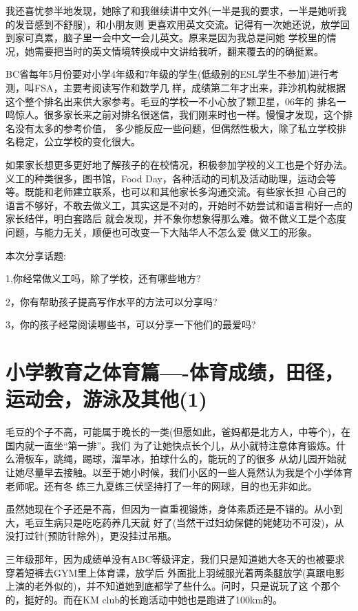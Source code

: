\documentclass[11pt,a4paper,onecolumn]{article}
\begin{document}
我还喜忧参半地发现，她除了和我继续讲中文外(一半是我的要求，一半是她听我的发音感到不舒服)，和小朋友则
更喜欢用英文交流。记得有一次她还说，放学回到家可真累，脑子里一会中文一会儿英文。原来是因为我总是问她
学校里的情况，她需要把当时的英文情境转换成中文讲给我听，翻来覆去的的确挺累。


BC省每年5月份要对小学4年级和7年级的学生(低级别的ESL学生不参加)进行考测，叫FSA，主要考阅读写作和数学几
样，成绩第二年才出来，菲沙机构就根据这个整个排名出来供大家参考。毛豆的学校一不小心放了颗卫星，06年的
排名一鸣惊人。很多家长来之前对排名很迷信，我们刚来时也一样。慢慢才发现，这个排名没有太多的参考价值，
多少能反应一些问题，但偶然性极大，除了私立学校排名稳定，公立学校的变化很大。


如果家长想更多更好地了解孩子的在校情况，积极参加学校的义工也是个好办法。义工的种类很多，图书馆，Food
Day，各种活动的司机及活动助理，运动会等等。既能和老师建立联系，也可以和其他家长多沟通交流。有些家长担
心自己的语言不够好，不敢去做义工，其实这是不对的，开始时不妨尝试和语言稍好一点的家长结伴，明白套路后
就会发现，并不象你想象得那么难。做不做义工是个态度问题，与能力无关，顺便也可改变一下大陆华人不怎么爱
做义工的形象。



本次分享话题:

1,你经常做义工吗，除了学校，还有哪些地方?

2，你有帮助孩子提高写作水平的方法可以分享吗?

3，你的孩子经常阅读哪些书，可以分享一下他们的最爱吗?

\section{小学教育之体育篇----体育成绩，田径，运动会，游泳及其他(1)}


毛豆的个子不高，可能属于晚长的一类(但愿如此，爸妈都是北方人，中等个)，在国内就一直坐``第一排''。我们
为了让她快点长个儿，从小就特注意体育锻炼。什么滑板车，跳绳，踢球，溜旱冰，拍球什么的，能玩的了的很多
从幼儿园开始就让她尽量早去接触。以至于她小时候，我们小区的一些人竟然认为我是个小学体育老师呢。还有冬
练三九夏练三伏坚持打了一年的网球，目的也无非如此。


虽然她现在个子还是不高，但因为一直重视锻炼，身体素质还是不错的。从小到大，毛豆生病只是吃吃药养几天就
好了(当然干过妇幼保健的姥姥功不可没)，从没打过针(预防针除外)，更没挂过吊瓶。


三年级那年，因为成绩单没有ABC等级评定，我们只是知道她大冬天的也被要求穿着短裤去GYM里上体育课，放学后
外面批上羽绒服光着两条腿放学(真跟电影上演的老外似的)，并不知道她到底都学了些什么。问时，只是说玩了这
个那个的，挺好的。而在KM club的长跑活动中她也是跑进了100km的。
\end{document}
